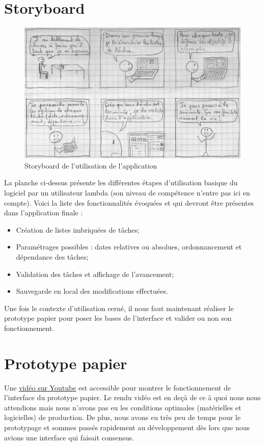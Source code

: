 	\section{Storyboard}
		\begin{figure}[h!]
		   \includegraphics{img/stotyboard_ihm.png}
		   \caption{Storyboard de l'utilisation de l'application}
		\end{figure}
	
		La planche ci-dessus présente les différentes étapes d'utilisation basique du logiciel par un utilisateur lambda (son niveau de compétence n'entre pas ici en compte). Voici la liste des fonctionnalités évoquées et qui devront être présentes dans l'application finale :
		\begin{itemize}
			\item Création de listes imbriquées de tâches;
			\item Paramétrages possibles : dates relatives ou absolues, ordonnancement et dépendance des tâches;
			\item Validation des tâches et affichage de l'avancement;
			\item Sauvegarde en local des modifications effectuées.
		\end{itemize}
		
		Une fois le contexte d'utilisation cerné, il nous faut maintenant réaliser le prototype papier pour poser les bases de l'interface et valider ou non son fonctionnement. 
	
	\section{Prototype papier}
	Une \href{https://www.youtube.com/watch?v=xbLaZvgkzjQ}{vidéo sur Youtube} est accessible pour montrer le fonctionnement de l'interface du prototype papier. Le rendu vidéo est en deçà de ce à quoi nous nous attendions mais nous n'avons pas eu les conditions optimales (matérielles et logicielles) de production. De plus, nous avons eu très peu de temps pour le prototypage et sommes passés rapidement au développement dès lors que nous avions une interface qui faisait consensus.
	
